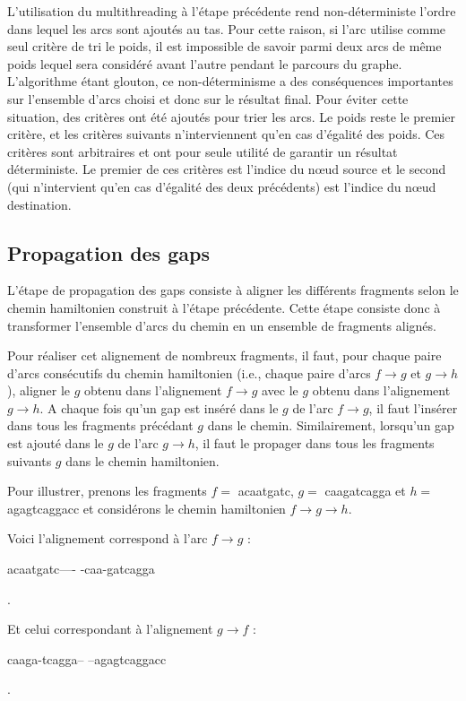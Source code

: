 \documentclass{article}
\begin{document}
L'utilisation du multithreading à l'étape précédente rend non-déterministe l'ordre dans lequel les arcs sont ajoutés au tas. Pour cette raison, si l'arc utilise comme seul critère de tri le poids, il est impossible de savoir parmi deux arcs de même poids lequel sera considéré avant l'autre pendant le parcours du graphe. L'algorithme étant glouton, ce non-déterminisme a des conséquences importantes sur l'ensemble d'arcs choisi et donc sur le résultat final. Pour éviter cette situation, des critères ont été ajoutés pour trier les arcs. Le poids reste le premier critère, et les critères suivants n'interviennent qu'en cas d'égalité des poids. Ces critères sont arbitraires et ont pour seule utilité de garantir un résultat déterministe. Le premier de ces critères est l'indice du nœud source et le second (qui n'intervient qu'en cas d'égalité des deux précédents) est l'indice du nœud destination.


\subsection{Propagation des gaps}

L'étape de propagation des gaps consiste à aligner les différents fragments selon le chemin hamiltonien construit à l'étape précédente. Cette étape consiste donc à transformer l'ensemble d'arcs du chemin en un ensemble de fragments alignés. 

Pour réaliser cet alignement de nombreux fragments, il faut, pour chaque paire d'arcs consécutifs du chemin hamiltonien (i.e., chaque paire d'arcs $f \to g$ et $g \to h$), aligner le $g$ obtenu dans l'alignement $f \to g$ avec le $g$ obtenu dans l'alignement $g \to h$. A chaque fois qu'un gap est inséré dans le $g$ de l'arc $f \to g$, il faut l'insérer dans tous les fragments précédant $g$ dans le chemin. Similairement, lorsqu'un gap est ajouté dans le $g$ de l'arc $g \to h$, il faut le propager dans tous les fragments suivants $g$ dans le chemin hamiltonien. 

Pour illustrer, prenons les fragments $f =$ acaatgatc, $g =$ caagatcagga et $h =$ agagtcaggacc et considérons le chemin hamiltonien $f \to g \to h$.

Voici l'alignement correspond à l'arc $f \to g$ :  
\begin{boxedverbatim}
acaatgatc----
-caa-gatcagga
\end{boxedverbatim}.

Et celui correspondant à l'alignement $g \to f$ :  
\begin{boxedverbatim}
caaga-tcagga--
--agagtcaggacc
\end{boxedverbatim}.
\end{document}
